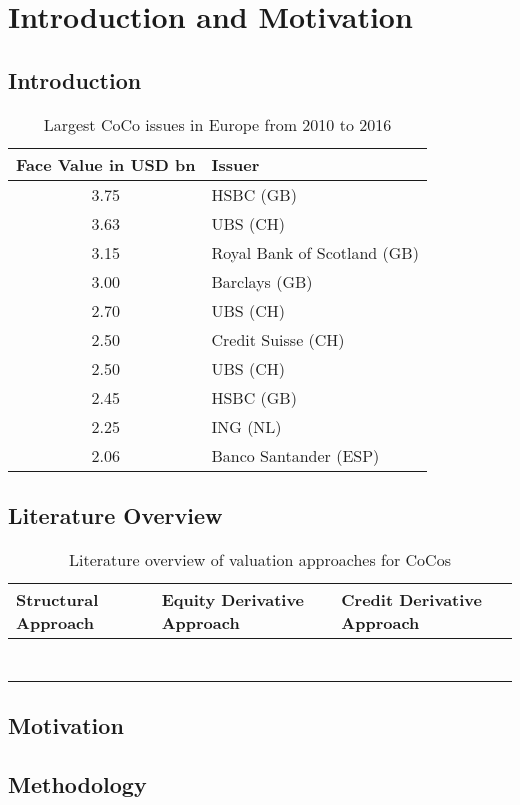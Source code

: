 \chapter{Introduction and Motivation}

\section{Introduction}

\begin{table}[h]
	\centering
	\begin{tabular}{cl}
		\toprule
			Face Value in USD bn & Issuer \\
		\midrule
			3.75 & HSBC (GB) \\
			3.63 & UBS (CH) \\
			3.15 & Royal Bank of Scotland (GB) \\
			3.00 & Barclays (GB) \\
			2.70 & UBS (CH) \\
			2.50 & Credit Suisse (CH) \\
			2.50 & UBS (CH) \\
			2.45 & HSBC (GB) \\
			2.25 & ING (NL) \\
			2.06 & Banco Santander (ESP)\\
		\bottomrule
	\end{tabular}
	\caption[Largest CoCo Issues in Europe]{Largest CoCo issues in Europe from 2010 to 2016 \citep{schmuddel2016}}
\end{table}

\section{Literature Overview}

\begin{table}[H]
	\setlength{\extrarowheight}{2.5pt}
	\centering
	\begin{tabular}{>{\centering\arraybackslash}p{4cm}>{\centering\arraybackslash}p{4cm}>{\centering\arraybackslash}p{4cm}}
		\toprule
			Structural Approach & Equity Derivative Approach & Credit Derivative Approach \\
		\midrule
			\citet{pennacchi2010structural} & \citet{de2011pricing} &  \citet{de2011pricing}\\
			\citet{glasserman2012contingent}  & \citet{henriques2011making} & \\
			\citet{madan2011conic}  &  &  \\
			\citet{albul2010contingent}  &  &  \\
			\citet{sundaresan2015design}  &  &  \\
			\citet{hilscher2014bank}  &  &  \\
			\citet{buergi2013pricing} &  &  \\
		\bottomrule
	\end{tabular}
	\caption[Literature overview of valuation approaches for CoCos] {Literature overview of valuation approaches for CoCos \citep{erismann2015pricing}}
\end{table}

\section{Motivation}

\section{Methodology}


